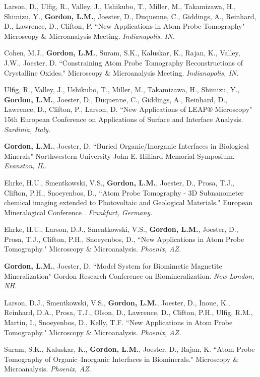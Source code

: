 Larson, D., Ulfig, R., Valley, J., Ushikubo, T., Miller, M., Takamizawa, H., Shimizu, Y., \textbf{Gordon, L.M.}, Joester, D., Duquenne, C., Giddings, A., Reinhard, D., Lawrence, D., Clifton, P. ``New Applications in Atom Probe Tomography" Microscopy \& Microanalysis Meeting. \emph{Indianapolis, IN.}

Cohen, M.J., \textbf{Gordon, L.M.}, Suram, S.K., Kaluskar, K., Rajan, K., Valley, J.W., Joester, D. ``Constraining Atom Probe Tomography Reconstructions of Crystalline Oxides." Microscopy \& Microanalysis Meeting. \emph{Indianapolis, IN.}

Ulfig, R., Valley, J., Ushikubo, T., Miller, M., Takamizawa, H., Shimizu, Y., \textbf{Gordon, L.M.}, Joester, D., Duquenne, C., Giddings, A., Reinhard, D., Lawrence, D., Clifton, P., Larson, D. ``New Applications of LEAP® Microscopy" 15th European Conference on Applications of Surface and Interface Analysis. \emph{Sardinia, Italy}.

\textbf{Gordon, L.M.}, Joester, D. ``Buried Organic/Inorganic Interfaces in Biological Minerals" Northwestern University John E. Hilliard Memorial Symposium. \emph{Evanston, IL.}

Ehrke, H.U., Smentkowski, V.S., \textbf{Gordon, L.M.}, Joester, D., Prosa, T.J., Clifton, P.H., Snoeyenbos, D., ``Atom Probe Tomography - 3D Subnanometer chemical imaging extended to Photovoltaic and Geological Materials." European Mineralogical Conference . \emph{Frankfurt, Germany.}

Ehrke, H.U., Larson, D.J., Smentkowski, V.S., \textbf{Gordon, L.M.}, Joester, D., Prosa, T.J., Clifton, P.H., Snoeyenbos, D., ``New Applications in Atom Probe Tomography." Microscopy \& Microanalysis. \emph{Phoenix, AZ.}

\textbf{Gordon, L.M.}, Joester, D. ``Model System for Biomimetic Magnetite Mineralization" Gordon Research Conference on Biomineralization. \emph{New London, NH.}

Larson, D.J., Smentkowski, V.S., \textbf{Gordon, L.M.}, Joester, D., Inoue, K.,  Reinhard, D.A., Prosa, T.J., Olson, D., Lawrence, D., Clifton, P.H., Ulfig, R.M., Martin, I., Snoeyenbos, D., Kelly, T.F. ``New Applications in Atom Probe Tomography." Microscopy \& Microanalysis. \emph{Phoenix, AZ.}

Suram, S.K., Kaluskar, K., \textbf{Gordon, L.M.}, Joester, D., Rajan, K. ``Atom Probe Tomography of Organic--Inorganic Interfaces in Biominerals." Microscopy \& Microanalysis. \emph{Phoenix, AZ.}

